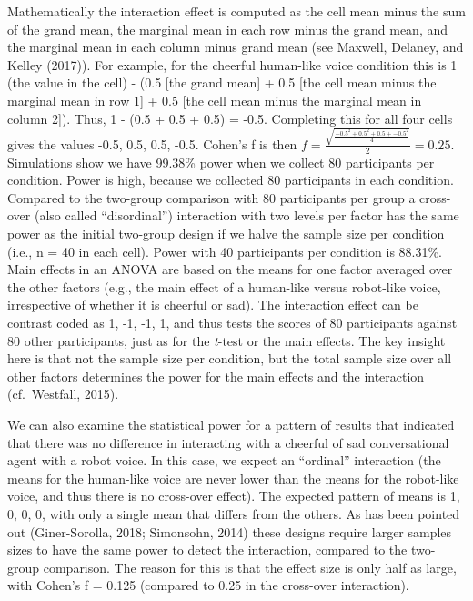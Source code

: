 \documentclass[,jou,floatsintext]{apa6}
\begin{document}
Mathematically the interaction effect is computed as the cell mean minus the sum of the grand mean, the marginal mean in each row minus the grand mean, and the marginal mean in each column minus grand mean (see Maxwell, Delaney, and Kelley (2017)). For example, for the cheerful human-like voice condition this is 1 (the value in the cell) - (0.5 {[}the grand mean{]} + 0.5 {[}the cell mean minus the marginal mean in row 1{]} + 0.5 {[}the cell mean minus the marginal mean in column 2{]}).
Thus, 1 - (0.5 + 0.5 + 0.5) = -0.5.
Completing this for all four cells gives the values -0.5, 0.5, 0.5, -0.5.
Cohen's f is then \(f = \frac { \sqrt { \frac { -0.5^2 + 0.5^2 + 0.5 + -0.5^2 } { 4 } }}{ 2 } = 0.25\).
Simulations show we have 99.38\% power when we collect 80 participants per condition.
Power is high, because we collected 80 participants in each condition.
Compared to the two-group comparison with 80 participants per group a cross-over (also called \enquote{disordinal}) interaction with two levels per factor has the same power as the initial two-group design if we halve the sample size per condition (i.e., n = 40 in each cell).
Power with 40 participants per condition is 88.31\%.
Main effects in an ANOVA are based on the means for one factor averaged over the other factors (e.g., the main effect of a human-like versus robot-like voice, irrespective of whether it is cheerful or sad).
The interaction effect can be contrast coded as 1, -1, -1, 1, and thus tests the scores of 80 participants against 80 other participants, just as for the \emph{t}-test or the main effects.
The key insight here is that not the sample size per condition, but the total sample size over all other factors determines the power for the main effects and the interaction (cf.~Westfall, 2015).

We can also examine the statistical power for a pattern of results that indicated that there was no difference in interacting with a cheerful of sad conversational agent with a robot voice.
In this case, we expect an \enquote{ordinal} interaction (the means for the human-like voice are never lower than the means for the robot-like voice, and thus there is no cross-over effect).
The expected pattern of means is 1, 0, 0, 0, with only a single mean that differs from the others.
As has been pointed out (Giner-Sorolla, 2018; Simonsohn, 2014) these designs require larger samples sizes to have the same power to detect the interaction, compared to the two-group comparison.
The reason for this is that the effect size is only half as large, with Cohen's f = 0.125 (compared to 0.25 in the cross-over interaction).
\end{document}
